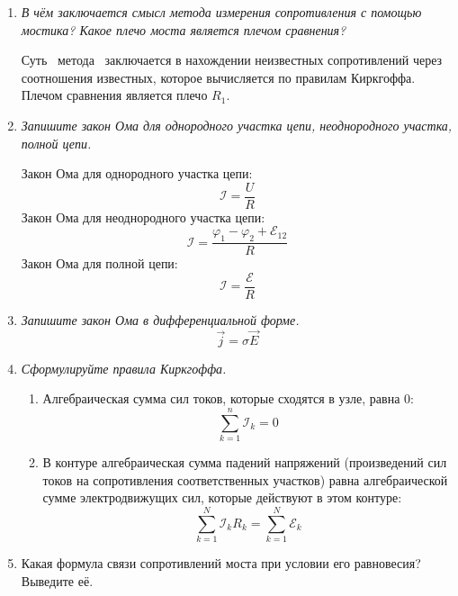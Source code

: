 \documentclass[a4paper,10pt]{article}
\begin{document}
\begin{enumerate}
\item \textit{В чём заключается смысл метода измерения сопротивления с помощью мостика? Какое плечо моста является плечом сравнения?}

Суть ~метода ~заключается в нахождении неизвестных сопротивлений через соотношения известных, которое вычисляется по правилам Киркгоффа.
Плечом сравнения является плечо $R_1$.
\item \textit{Запишите закон Ома для однородного участка цепи, неоднородного участка, полной цепи.}

Закон Ома для однородного участка цепи:
$$\mathcal{I} = \frac{U}{R}$$
Закон Ома для неоднородного участка цепи:
$$\mathcal{I} = \frac{\varphi_1 - \varphi_2 + \mathcal{E}_{12}}{R}$$
Закон Ома для полной цепи:
$$\mathcal{I} = \frac{\mathcal E}{R}$$
\item \textit{Запишите закон Ома в дифференциальной форме.}
$$\vec{j} = \sigma\vec{E}$$
\item \textit{Сформулируйте правила Киркгоффа.}
\begin{enumerate}
\item Алгебраическая сумма сил токов, которые сходятся в узле, равна 0:
$$\sum\limits_{k=1}^n \mathcal{I}_k = 0$$
\item В контуре алгебраическая сумма падений напряжений (произведений сил токов на сопротивления соответственных участков) равна
алгебраической сумме электродвижущих сил, которые действуют в этом контуре:
$$\sum\limits_{k=1}^N \mathcal{I}_kR_k = \sum\limits_{k=1}^N\mathcal{E}_k$$
\end{enumerate}
\item {Какая формула связи сопротивлений моста при условии его равновесия? Выведите её.}


\end{enumerate}
\end{document}
